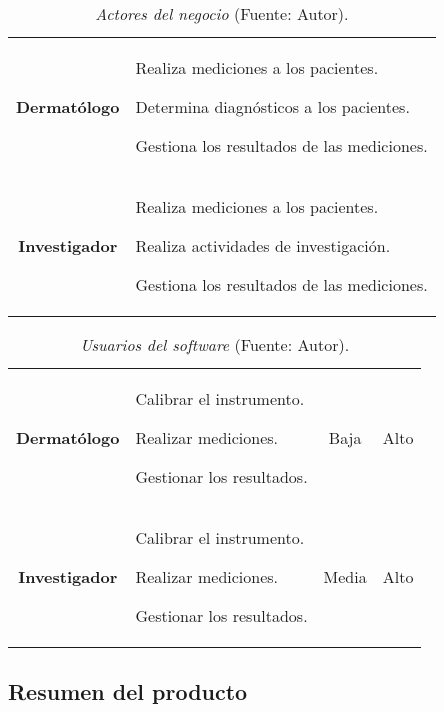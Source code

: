		\begin{table}[h]
		\small
		\caption[Actores del negocio]{\textit{Actores del negocio} (Fuente: Autor).}
		\centering
		\setlength{\extrarowheight}{\altocelda}
		\begin{tabulary}{\anchotabla}{|c|J|}
			\hline
			 & \\ \hline
			\textbf{Dermat\'{o}logo} & 
			Realiza mediciones a los pacientes.
			
			Determina diagn\'{o}sticos a los pacientes.
			
			Gestiona los resultados de las mediciones.
		\\ \hline
			\textbf{Investigador} &
			Realiza mediciones a los pacientes.
			
			Realiza actividades de investigaci\'{o}n.
			
			Gestiona los resultados de las mediciones.\\ \hline
		\end{tabulary}
	\end{table}
	
			\begin{table}[h]
		\small
		\caption[Usuarios del software]{\textit{Usuarios del software} (Fuente: Autor).}
		\centering
		\setlength{\extrarowheight}{\altocelda}
		\begin{tabulary}{\anchotabla}{|c|L|c|c|}
			\hline
			 &  &  & \\ \hline
			\textbf{Dermat\'{o}logo} &
			Calibrar el instrumento.
			
			Realizar mediciones.
			
			Gestionar los resultados. &
			Baja &
			Alto\\ \hline
			
			\textbf{Investigador} &
			Calibrar el instrumento.
			
			Realizar mediciones.
			
			Gestionar los resultados. &
			Media &
			Alto\\ \hline
		\end{tabulary}
	\end{table}
	
	\subsection{Resumen del producto}
	
